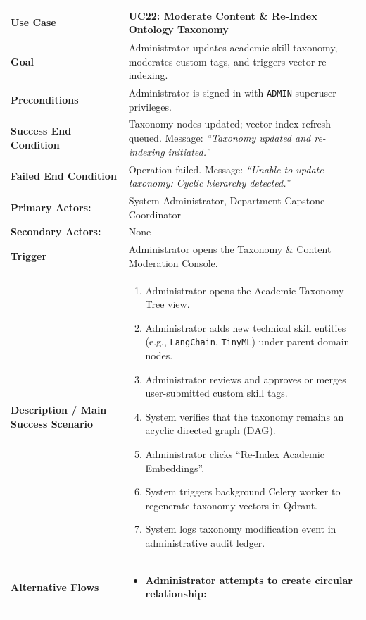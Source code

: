\begin{table}[H]
\centering
\small
\begin{tabularx}{\textwidth}{|l|X|}
\hline
\rowcolor{lightgray!40} \textbf{Use Case} & \textbf{UC22: Moderate Content \& Re-Index Ontology Taxonomy} \\ \hline
\textbf{Goal} & Administrator updates academic skill taxonomy, moderates custom tags, and triggers vector re-indexing. \\ \hline
\textbf{Preconditions} & Administrator is signed in with \texttt{ADMIN} superuser privileges. \\ \hline
\textbf{Success End Condition} & Taxonomy nodes updated; vector index refresh queued. Message: \textit{``Taxonomy updated and re-indexing initiated.''} \\ \hline
\textbf{Failed End Condition} & Operation failed. Message: \textit{``Unable to update taxonomy: Cyclic hierarchy detected.''} \\ \hline
\textbf{Primary Actors:} & System Administrator, Department Capstone Coordinator \\
\textbf{Secondary Actors:} & None \\ \hline
\textbf{Trigger} & Administrator opens the Taxonomy \& Content Moderation Console. \\ \hline
\textbf{Description / Main Success Scenario} &
\begin{enumerate}[leftmargin=*]
    \item Administrator opens the Academic Taxonomy Tree view.
    \item Administrator adds new technical skill entities (e.g., \texttt{LangChain}, \texttt{TinyML}) under parent domain nodes.
    \item Administrator reviews and approves or merges user-submitted custom skill tags.
    \item System verifies that the taxonomy remains an acyclic directed graph (DAG).
    \item Administrator clicks ``Re-Index Academic Embeddings''.
    \item System triggers background Celery worker to regenerate taxonomy vectors in Qdrant.
    \item System logs taxonomy modification event in administrative audit ledger.
\end{enumerate} \\ \hline
\textbf{Alternative Flows} &
\begin{itemize}[leftmargin=*]
    \item[\textbf{4.a.}] \textbf{Administrator attempts to create circular relationship:}

\end{itemize}
\end{tabularx}
\end{table}
